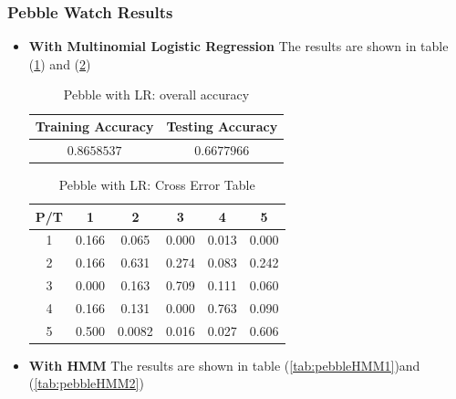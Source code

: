 \subsubsection{Pebble Watch Results}
\label{subsec:pebbleresult}
\begin{itemize}
\item \textbf{With Multinomial Logistic Regression} 
The results are shown in table (\ref{tab:pebbleLR1}) and (\ref{tab:pebbleLR2})

\begin{table}[!htb]
\begin{center}
\begin{tabular}{c|c}
      \hline
      Training Accuracy & Testing Accuracy\\
      \hline
      $0.8658537$ & $0.6677966$ \\
      \hline
\end{tabular}
\caption{Pebble with LR: overall accuracy}
\label{tab:pebbleLR1}
\end{center}
\end{table}

\begin{table}[!htb]
\begin{center}
\begin{tabular}{c|c|c|c|c|c}
      \hline
      P/T& 1 & 2 &3 & 4 & 5 \\
      \hline
      1 &0.166&0.065&0.000&0.013&0.000\\
      2 &0.166&0.631&0.274&0.083&0.242\\
      3 &0.000&0.163&0.709&0.111&0.060\\
      4 &0.166&0.131&0.000&0.763&0.090\\
      5 &0.500&0.0082&0.016&0.027&0.606\\
      \hline
\end{tabular}
\caption{Pebble with LR: Cross Error Table}
\label{tab:pebbleLR2}
\end{center}
\end{table}

\item \textbf{With HMM}
The results are shown in table (\ref{tab:pebbleHMM1})and (\ref{tab:pebbleHMM2})


\end{itemize}
